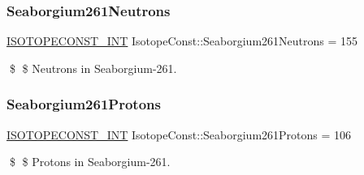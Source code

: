 \subsubsection{\texorpdfstring{Seaborgium261\+Neutrons}{Seaborgium261Neutrons}}
{\footnotesize\ttfamily \mbox{\hyperlink{group___isotope_const-_macros_ga5f18360b3e99483a35c32d789e62621c}{I\+S\+O\+T\+O\+P\+E\+C\+O\+N\+S\+T\+\_\+\+I\+NT}} Isotope\+Const\+::\+Seaborgium261\+Neutrons = 155}

\$ \$ Neutrons in Seaborgium-\/261. \mbox{\label{group___isotope_const-_seaborgium-_sg261_ga618ed53fb30ceb019d1b635131989882}} 
\subsubsection{\texorpdfstring{Seaborgium261\+Protons}{Seaborgium261Protons}}
{\footnotesize\ttfamily \mbox{\hyperlink{group___isotope_const-_macros_ga5f18360b3e99483a35c32d789e62621c}{I\+S\+O\+T\+O\+P\+E\+C\+O\+N\+S\+T\+\_\+\+I\+NT}} Isotope\+Const\+::\+Seaborgium261\+Protons = 106}

\$ \$ Protons in Seaborgium-\/261. 